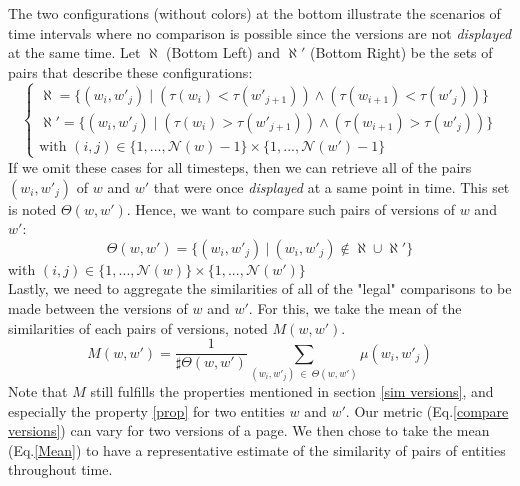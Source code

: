 \documentclass[sigconf]{acmart}
\begin{document}
The two configurations (without colors) at the bottom illustrate the scenarios of time intervals where no comparison is possible since the versions are not \emph{displayed} at the same time. Let $\aleph$ (Bottom Left) and $\aleph'$ (Bottom Right) be the sets of pairs that describe these configurations:
\begin{equation}
    \begin{cases}
    \aleph = \{(w_i,w'_j)\;| \;(\tau(w_i)<\tau(w'_{j+1})) \land (\tau(w_{i+1})<\tau(w'_{j})) \}\\
    \aleph' = \{(w_i,w'_j)\;| \;(\tau(w_i)>\tau(w'_{j+1})) \land (\tau(w_{i+1})>\tau(w'_{j}))\}\\
    \text{with } (i,j) \in \{1,...,\mathcal{N}(w)-1\}\times\{1,...,\mathcal{N}(w')-1\}
    \end{cases}
\end{equation}
If we omit these cases for all timesteps, then we can retrieve all of the pairs $(w_i,w'_{j})$ of $w$ and $w'$ that were once \emph{displayed} at a same point in time. This set is noted $\Theta(w,w')$.
Hence, we want to compare such pairs of versions of $w$ and $w'$:
\begin{equation}
    \label{legal pairs}
    \Theta(w,w')= \{(w_i,w'_j)\:| \:(w_i,w'_j) \notin \aleph \cup \aleph'\}
\end{equation}
with $(i,j) \in \{1,...,\mathcal{N}(w)\}\times\{1,...,\mathcal{N}(w')\}$\\
Lastly, we need to aggregate the similarities of all of the "legal" comparisons to be made between the versions of $w$ and $w'$. For this, we take the mean of the similarities of each pairs of versions, noted $M(w,w')$. 
\begin{equation}
    \label{Mean}
    M(w,w') = \frac{1}{\sharp \Theta(w,w')}\sum_{(w_i,w'_j)\: \in \:\Theta(w,w')}\mu (w_i,w'_{j})
\end{equation}
Note that $M$ still fulfills the properties mentioned in section \ref{sim versions}, and especially the property \ref{prop} for two entities $w$ and $w'$. Our metric (Eq.\ref{compare versions}) can vary for two versions of a page. We then chose to take the mean (Eq.\ref{Mean}) to have a representative estimate of the similarity of pairs of entities throughout time.
\end{document}
